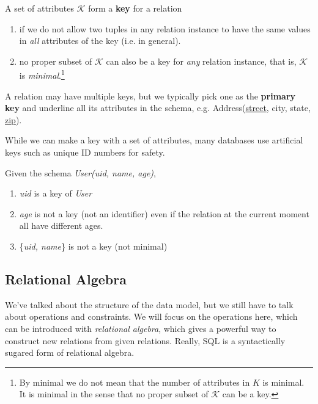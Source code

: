 \documentclass{article}
\begin{document}
    \begin{definition}[Key]
      A set of attributes $\mathcal{K}$ form a \textbf{key} for a relation 
      \begin{enumerate}
        \item if we do not allow two tuples in any relation instance to have the same values in \textit{all} attributes of the key (i.e. in general). 
        \item no proper subset of $\mathcal{K}$ can also be a key for \textit{any} relation instance, that is, $\mathcal{K}$ is \textit{minimal}.\footnote{By minimal we do not mean that the number of attributes in $K$ is minimal. It is minimal in the sense that no proper subset of $\mathcal{K}$ can be a key.}
      \end{enumerate}
      A relation may have multiple keys, but we typically pick one as the \textbf{primary key} and underline all its attributes in the schema, e.g. Address(\underline{street}, city, state, \underline{zip}). 
    \end{definition}

    While we can make a key with a set of attributes, many databases use artificial keys such as unique ID numbers for safety. 

    \begin{example}
      Given the schema \textit{User(uid, name, age)}, 
      \begin{enumerate}
        \item \textit{uid} is a key of \textit{User} 
        \item \textit{age} is not a key (not an identifier) even if the relation at the current moment all have different ages. 
        \item \{\textit{uid, name}\} is not a key (not minimal)
      \end{enumerate}
    \end{example}

  \subsection{Relational Algebra}

    We've talked about the structure of the data model, but we still have to talk about operations and constraints. We will focus on the operations here, which can be introduced with \textit{relational algebra}, which gives a powerful way to construct new relations from given relations. Really, SQL is a syntactically sugared form of relational algebra. 
\end{document}
